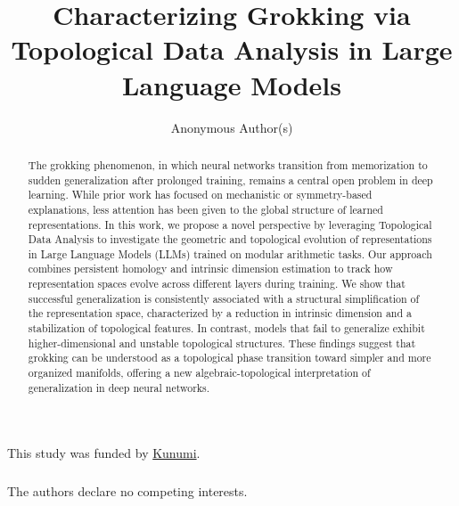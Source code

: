 \documentclass[runningheads]{llncs.cls}
\begin{document}
\title{Characterizing Grokking via Topological Data Analysis in Large Language Models}

%
    \author{Anonymous Author(s)}



%
\maketitle              

\begin{abstract}
The grokking phenomenon, in which neural networks transition from memorization to sudden generalization after prolonged training, remains a central open problem in deep learning. While prior work has focused on mechanistic or symmetry-based explanations, less attention has been given to the global structure of learned representations. In this work, we propose a novel perspective by leveraging Topological Data Analysis to investigate the geometric and topological evolution of representations in Large Language Models (LLMs) trained on modular arithmetic tasks. Our approach combines persistent homology and intrinsic dimension estimation to track how representation spaces evolve across different layers during training. We show that successful generalization is consistently associated with a structural simplification of the representation space, characterized by a reduction in intrinsic dimension and a stabilization of topological features. In contrast, models that fail to generalize exhibit higher-dimensional and unstable topological structures. These findings suggest that grokking can be understood as a topological phase transition toward simpler and more organized manifolds, offering a new algebraic-topological interpretation of generalization in deep neural networks.
\end{abstract}

\newpage

%
%
%
%
%
%








\begin{credits}
\subsubsection{\ackname} This study was funded by \href{https://www.kunumi.com/}{Kunumi}.

\subsubsection{\discintname}
The authors declare no competing interests.
\end{credits}



\end{document}
